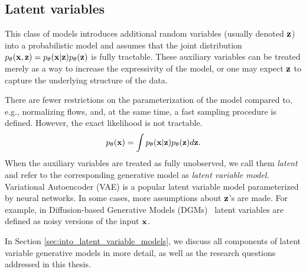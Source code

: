 \subsection{Latent variables}
This class of models introduces additional random variables (usually denoted ${\mathbf{z}}$) into a probabilistic model and assumes that the joint distribution $p_{\theta}({\mathbf{x}}, {\mathbf{z}}) = p_{\theta}({\mathbf{x}}| {\mathbf{z}})p_{\theta}({\mathbf{z}})$ is fully tractable. These auxiliary variables can be treated merely as a way to increase the expressivity of the model, or one may expect ${\mathbf{z}}$ to capture the underlying structure of the data. 

There are fewer restrictions on the parameterization of the model compared to, e.g., normalizing flows, and, at the same time, a fast sampling procedure is defined. However, the exact likelihood is not tractable. 
\begin{equation}\label{eq:intro_lvm_def}
     p_{\theta}(\rvx) = \int  p_{\theta}(\rvx| \rvz)p_{\theta}(\rvz) d\rvz.
\end{equation}
When the auxiliary variables are treated as fully unobserved, we call them \textit{latent} and refer to the corresponding generative model as \textit{latent variable model}. 
Variational Autoencoder (VAE) \citep{kingma2014autoencoding, rezende2014stochastic} is a popular latent variable model parameterized by neural networks. 
In some cases, more assumptions about ${\mathbf{z}}$'s are made. For example, in Diffusion-based Generative Models (DGMs)~\citep{sohl2015deep, ho2020denoising} latent variables are defined as noisy versions of the input ${\mathbf{x}}$. 

In Section \ref{sec:into_latent_variable_models}, we discuss all components of latent variable generative models in more detail, as well as the research questions addressed in this thesis.




